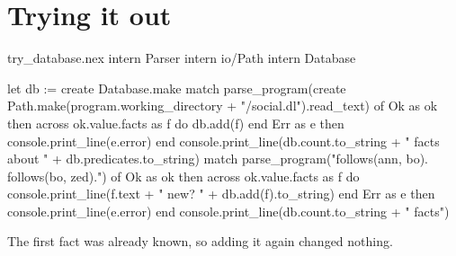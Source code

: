 \section{Trying it out}

\begin{tryit}{try_database.nex}
intern Parser
intern io/Path
intern Database

let db := create Database.make
match parse_program(create Path.make(program.working_directory + "/social.dl").read_text) of
  Ok as ok then
    across ok.value.facts as f do
      db.add(f)
    end
  Err as e then console.print_line(e.error)
end
console.print_line(db.count.to_string + " facts about " + db.predicates.to_string)
match parse_program("follows(ann, bo). follows(bo, zed).") of
  Ok as ok then
    across ok.value.facts as f do
      console.print_line(f.text + " new? " + db.add(f).to_string)
    end
  Err as e then console.print_line(e.error)
end
console.print_line(db.count.to_string + " facts")
\end{tryit}

The first fact was already known, so adding it again changed nothing.
